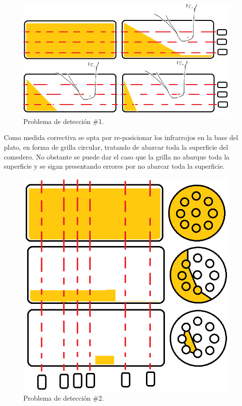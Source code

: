     \begin{figure}[H]
	    \begin{center}
	    	\includegraphics[scale=0.50]{img/infra2.png}
        \end{center}
	    \caption{Problema de detección \#1. \label{infra2png}}
    \end{figure}

    Como medida correctiva se opta por re-posicionar los infrarrojos en la base del plato, en forma de grilla circular, tratando de abarcar toda la superficie del comedero. No obstante se puede dar el caso que la grilla no abarque toda la superficie y se sigan presentando errores por no abarcar toda la superficie.

    \begin{figure}[H]
	    \begin{center}
	    	\includegraphics[scale=0.45]{img/infra3.png}
        \end{center}
	    \caption{Problema de detección \#2. \label{infra3png}}
    \end{figure}

